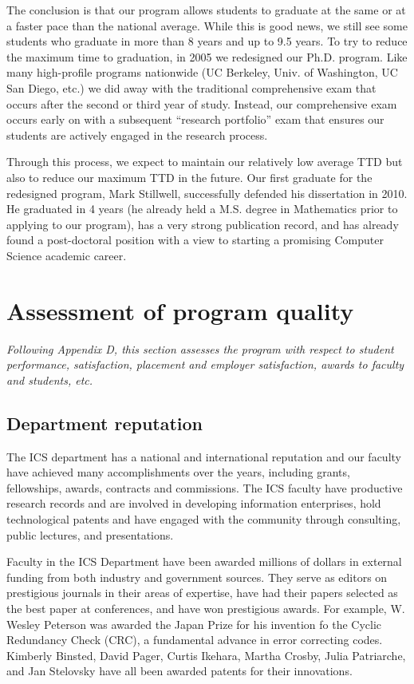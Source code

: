 \documentclass[12pt]{article}
\begin{document}
The conclusion is that our program allows students to graduate at the same
or at a faster pace than the national average.  While this is good news, we
still see some students who graduate in more than 8 years and up to 9.5
years. To try to reduce the maximum time to graduation, in 2005 we 
redesigned our Ph.D. program.  Like many high-profile programs nationwide
(UC Berkeley, Univ.  of Washington, UC San Diego, etc.) we did away
with the traditional comprehensive exam that occurs after the second or
third year of study. Instead, our comprehensive exam occurs early on with a
subsequent ``research portfolio'' exam that ensures our students are
actively engaged in the research process.

Through this process, we expect to maintain our relatively low average TTD
but also to reduce our maximum TTD in the future. Our first graduate for
the redesigned program, Mark Stillwell, successfully defended his
dissertation in 2010. He graduated in 4 years (he already held a
M.S. degree in Mathematics prior to applying to our program), has a very
strong publication record, and has already found a post-doctoral position
with a view to starting a promising Computer Science academic career.


\section{Assessment of program quality}

{\em Following Appendix D, this section assesses the program with respect
  to student performance, satisfaction, placement and employer
  satisfaction, awards to faculty and students, etc.}

\subsection{Department reputation}
\label{sec:reputation}

The ICS department has a national and international reputation and our
faculty have achieved many accomplishments over the years, including
grants, fellowships, awards, contracts and commissions. The ICS faculty
have productive research records and are involved in developing information
enterprises, hold technological patents and have engaged with the community
through consulting, public lectures, and presentations. 

Faculty in the ICS Department have been awarded millions of dollars in
external funding from both industry and government sources.  They serve as
editors on prestigious journals in their areas of expertise, have had their
papers selected as the best paper at conferences, and have won prestigious
awards.  For example, W. Wesley Peterson was awarded the Japan Prize for
his invention fo the Cyclic Redundancy Check (CRC), a fundamental advance
in error correcting codes. Kimberly Binsted, David Pager, Curtis Ikehara,
Martha Crosby, Julia Patriarche, and Jan Stelovsky have all been awarded
patents for their innovations.
\end{document}
